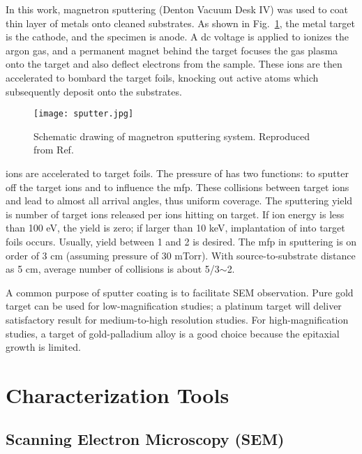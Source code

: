 In this work, magnetron sputtering (Denton Vacuum Desk IV) was used to coat thin layer of metals onto cleaned substrates. As shown in Fig.~\ref{fig:ch2magsp}, the metal target is the cathode, and the specimen is anode. A dc voltage is applied to ionizes the argon gas, and a permanent magnet behind the target focuses the gas plasma onto the target and also deflect electrons from the sample. These ions are then accelerated to bombard the target foils, knocking out active atoms which subsequently deposit onto the substrates. 
\begin{figure}[htb]
\centering
\texttt{[image: sputter.jpg]}
\caption[Schematic drawing of magnetron sputtering system]{Schematic drawing of magnetron sputtering system. Reproduced from Ref.\cite{Goldstein2007}}
\label{fig:ch2magsp}
\end{figure}
 ions are accelerated to target foils. The pressure of  has two functions: to sputter off the target ions and to influence the \gls{mfp}. These collisions between target ions and  lead to almost all arrival angles, thus uniform coverage. The sputtering yield is number of target ions released per ions hitting on target. If  ion energy is less than 100 eV, the yield is zero; if larger than 10 keV, implantation of  into target foils occurs. Usually, yield between 1 and 2 is desired. The \gls{mfp} in sputtering is on order of 3 cm (assuming pressure of 30 mTorr). With source-to-substrate distance as 5 cm, average number of collisions is about 5/3$\sim$2. 

A common purpose of sputter coating is to facilitate SEM observation. Pure gold target can be used for low-magnification studies; a platinum target will deliver satisfactory result for medium-to-high resolution studies. For high-magnification studies, a target of gold-palladium alloy is a good choice because the epitaxial growth is limited.\cite{Goldstein2007} 

\section{Characterization Tools}
\subsection{Scanning Electron Microscopy (SEM)}\label{sec:sem}


